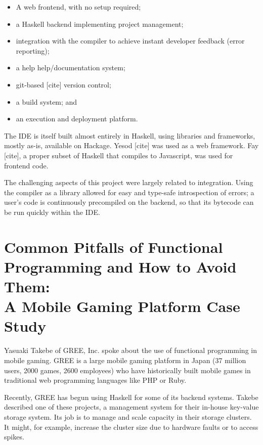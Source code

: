 \documentclass{jfp1}
\newcommand\needcite{{\color{red} [cite]}\xspace}
\begin{document}
\begin{itemize}

\item A web frontend, with no setup required;

\item a Haskell backend implementing project management;

\item integration with the compiler to achieve instant developer
feedback (error reporting); 

\item a help help/documentation system;

\item git-based\needcite version control;

\item a build system; and

\item an execution and deployment platform.

\end{itemize}

The IDE is itself built almost entirely in Haskell, using libraries
and frameworks, mostly as-is, available on Hackage. Yesod\needcite 
was used as a web framework. Fay\needcite, a proper subset of Haskell
that compiles to Javascript, was used for frontend code.

The challenging aspects of this project were largely related
to integration. Using the compiler as a library allowed for easy
and type-safe introspection of errors; a user's code is continuously
precompiled on the backend, so that its bytecode can be run
quickly within the IDE.

\section{Common Pitfalls of Functional Programming and How 
to Avoid Them:\\ A Mobile Gaming Platform Case Study}


Yasuaki Takebe of GREE, Inc. spoke about the use of functional
programming in mobile gaming. GREE is a large mobile gaming
platform in Japan (37 million users, 2000 games, 
2600 employees) who have historically built mobile games in
traditional web programming languages like PHP or Ruby.

Recently, GREE has begun using Haskell for some of its backend
systems. Takebe described one of these projects, a management system
for their in-house key-value storage system. Its job is to manage and
scale capacity in their storage clusters. It might, for example,
increase the cluster size due to hardware faults or to access spikes.
\end{document}
